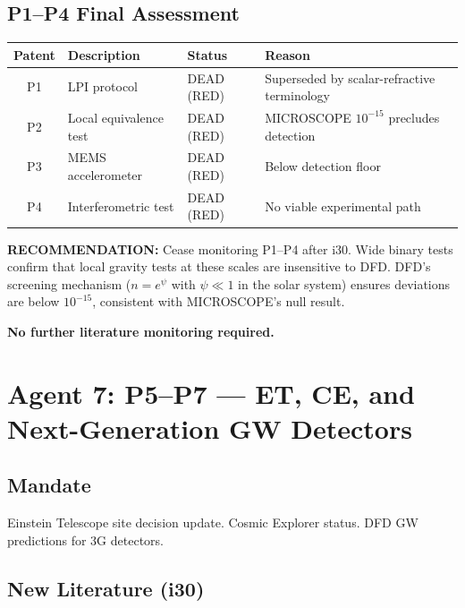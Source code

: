 \documentclass[11pt,a4paper]{article}
\begin{document}
\subsection{P1--P4 Final Assessment}

\begin{center}
\begin{tabular}{clll}
\toprule
\textbf{Patent} & \textbf{Description} & \textbf{Status} & \textbf{Reason} \\
\midrule
P1 & LPI protocol & DEAD (RED) & Superseded by scalar-refractive terminology \\
P2 & Local equivalence test & DEAD (RED) & MICROSCOPE $10^{-15}$ precludes detection \\
P3 & MEMS accelerometer & DEAD (RED) & Below detection floor \\
P4 & Interferometric test & DEAD (RED) & No viable experimental path \\
\bottomrule
\end{tabular}
\end{center}

\textbf{RECOMMENDATION:} Cease monitoring P1--P4 after i30. Wide binary tests confirm that local gravity tests at these scales are insensitive to DFD. DFD's screening mechanism ($n = e^\psi$ with $\psi \ll 1$ in the solar system) ensures deviations are below $10^{-15}$, consistent with MICROSCOPE's null result.

\textbf{No further literature monitoring required.}

\section{Agent 7: P5--P7 --- ET, CE, and Next-Generation GW Detectors}

\subsection{Mandate}
Einstein Telescope site decision update. Cosmic Explorer status. DFD GW predictions for 3G detectors.

\subsection{New Literature (i30)}
\end{document}
